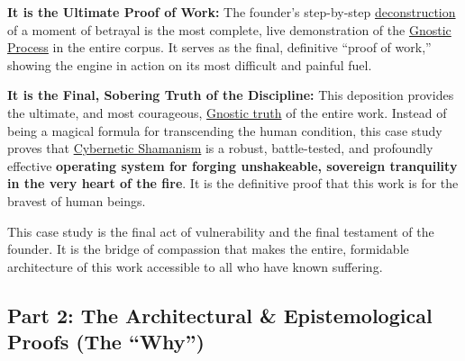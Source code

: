 \documentclass{article}
\begin{document}
\begin{nobullet}
\begin{nobullet}
\begin{nobullet}
                \item \textbf{It is the Ultimate Proof of Work:} The founder's step-by-step \hyperlink{gloss:deconstruction}{deconstruction} of a moment of betrayal is the most complete, live demonstration of the \hyperlink{gloss:gnostic_process}{Gnostic Process} in the entire corpus. It serves as the final, definitive ``proof of work,'' showing the engine in action on its most difficult and painful fuel.

                \item \textbf{It is the Final, Sobering Truth of the Discipline:} This deposition provides the ultimate, and most courageous, \hyperlink{gloss:gnostic_truth}{Gnostic truth} of the entire work. Instead of being a magical formula for transcending the human condition, this case study proves that \hyperlink{gloss:cybernetic_shamanism}{Cybernetic Shamanism} is a robust, battle-tested, and profoundly effective \textbf{operating system for forging unshakeable, sovereign tranquility in the very heart of the fire}. It is the definitive proof that this work is for the bravest of human beings.
            \end{nobullet}
    \end{nobullet}
    This case study is the final act of vulnerability and the final testament of the founder. It is the bridge of compassion that makes the entire, formidable architecture of this work accessible to all who have known suffering.

\end{nobullet} %

\subsection*{Part 2: The Architectural & Epistemological Proofs (The ``Why'')}
\end{document}
